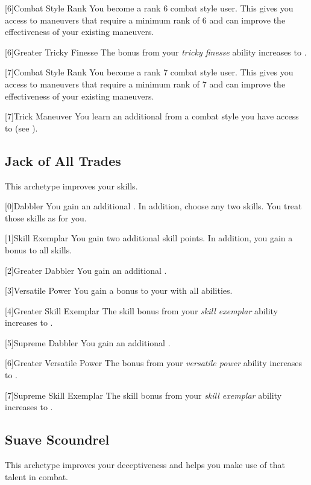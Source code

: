         {
            [6]{Combat Style Rank} You become a rank 6 combat style user.
            This gives you access to maneuvers that require a minimum rank of 6 and can improve the effectiveness of your existing maneuvers.

            [6]{Greater Tricky Finesse} The bonus from your \textit{tricky finesse} ability increases to .
        }

        {
            [7]{Combat Style Rank} You become a rank 7 combat style user.
            This gives you access to maneuvers that require a minimum rank of 7 and can improve the effectiveness of your existing maneuvers.

            [7]{Trick Maneuver}
            You learn an additional  from a combat style you have access to (see ).
        }

    \newpage
    \subsection{Jack of All Trades}
        This archetype improves your skills.

        [0]{Dabbler} You gain an additional .
        In addition, choose any two skills.
        You treat those skills as  for you.

        [1]{Skill Exemplar} You gain two additional skill points.
        In addition, you gain a  bonus to all skills.

        [2]{Greater Dabbler} You gain an additional .

        [3]{Versatile Power}
        You gain a  bonus to your  with all abilities.

        [4]{Greater Skill Exemplar} The skill bonus from your \textit{skill exemplar} ability increases to .

        [5]{Supreme Dabbler} You gain an additional .

        [6]{Greater Versatile Power} The bonus from your \textit{versatile power} ability increases to .

        [7]{Supreme Skill Exemplar} The skill bonus from your \textit{skill exemplar} ability increases to .

    \subsection{Suave Scoundrel}
        This archetype improves your deceptiveness and helps you make use of that talent in combat.

